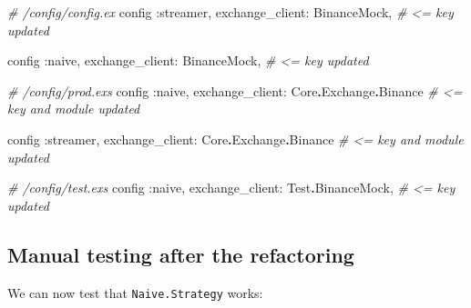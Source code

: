 \documentclass[
  oneside]{book}
\newenvironment{Shaded}{\begin{snugshade}}{\end{snugshade}}
\newcommand{\CommentTok}[1]{\textcolor[rgb]{0.56,0.35,0.01}{\textit{#1}}}
\newcommand{\ConstantTok}[1]{\textcolor[rgb]{0.56,0.35,0.01}{#1}}
\newcommand{\NormalTok}[1]{#1}
\newcommand{\OperatorTok}[1]{\textcolor[rgb]{0.81,0.36,0.00}{\textbf{#1}}}
\newcommand{\VariableTok}[1]{\textcolor[rgb]{0.00,0.00,0.00}{#1}}
\begin{document}
\begin{Shaded}
\begin{Highlighting}[]
\CommentTok{\# /config/config.ex }
\NormalTok{config }\VariableTok{:streamer}\NormalTok{,}
  \VariableTok{exchange\_client:} \ConstantTok{BinanceMock}\NormalTok{, }\CommentTok{\# \textless{}= key updated}

\NormalTok{config }\VariableTok{:naive}\NormalTok{,}
  \VariableTok{exchange\_client:} \ConstantTok{BinanceMock}\NormalTok{, }\CommentTok{\# \textless{}= key updated}

\CommentTok{\# /config/prod.exs}
\NormalTok{config }\VariableTok{:naive}\NormalTok{,}
  \VariableTok{exchange\_client:} \ConstantTok{Core}\OperatorTok{.}\ConstantTok{Exchange}\OperatorTok{.}\ConstantTok{Binance} \CommentTok{\# \textless{}= key and module updated}

\NormalTok{config }\VariableTok{:streamer}\NormalTok{,}
  \VariableTok{exchange\_client:} \ConstantTok{Core}\OperatorTok{.}\ConstantTok{Exchange}\OperatorTok{.}\ConstantTok{Binance} \CommentTok{\# \textless{}= key and module updated}

\CommentTok{\# /config/test.exs}
\NormalTok{config }\VariableTok{:naive}\NormalTok{,}
  \VariableTok{exchange\_client:} \ConstantTok{Test}\OperatorTok{.}\ConstantTok{BinanceMock}\NormalTok{, }\CommentTok{\# \textless{}= key updated}
\end{Highlighting}
\end{Shaded}

\newpage

\subsection{Manual testing after the refactoring}\label{manual-testing-after-the-refactoring}

We can now test that \texttt{Naive.Strategy} works:
\end{document}
